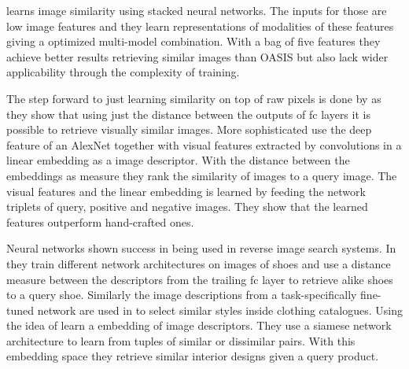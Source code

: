 \citet{wu_online_2013} learns image similarity using stacked neural networks. The inputs for those are low image features and they learn representations of modalities of these features giving a optimized multi-model combination. With a bag of five features they achieve better results retrieving similar images than OASIS but also lack wider applicability through the complexity of training.

The step forward to just learning similarity on top of raw pixels is done by \citet{babenko_neural_2014} as they show that using just the distance between  the outputs of \gls{fc} layers it is possible to retrieve visually similar images. More sophisticated \citet{wang_learning_2014} use the deep feature of an AlexNet\citep{krizhevsky_imagenet_2012} together with visual features extracted by convolutions in a linear embedding as a image descriptor. With the distance between the embeddings as measure they rank the similarity of images to a query image. The visual features and the linear embedding is learned by feeding the network triplets of query, positive and negative images. They show that the learned features outperform hand-crafted ones.

Neural networks shown success in being used in reverse image search systems. In \citep{khosla_building_2015} they train different network architectures on images of shoes and use a distance measure between the descriptors from the trailing \gls{fc} layer to retrieve alike shoes to a query shoe. Similarly the image descriptions from a task-specifically fine-tuned network are used in \citep{chen_visual-based_2015} to select similar styles inside clothing catalogues. Using the idea of \citep{wang_learning_2014} \citet{bell_learning_2015} learn a embedding of image descriptors. They use a siamese network architecture to learn from tuples of similar or dissimilar pairs. With this embedding space they retrieve similar interior designs given a query product.
